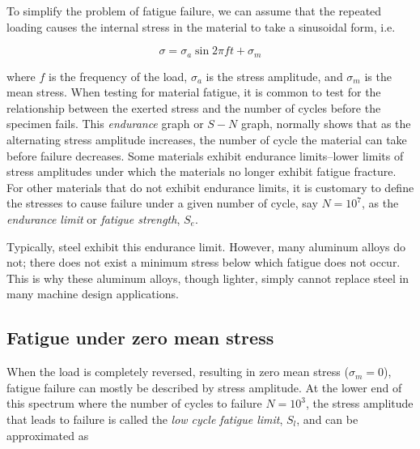 \documentclass[a4paper,openany,12pt]{book}
\begin{document}
To simplify the problem of fatigue failure, we can assume that the
repeated loading causes the internal stress in the material to take a
sinusoidal form, i.e.


$$\sigma  = \sigma _a\sin 2\pi ft + \sigma _m$$

where \(f\) is the frequency of the load, \(\sigma_a\) is the stress
amplitude, and \(\sigma_m\) is the mean stress. When testing for material
fatigue, it is common to test for the relationship between the exerted
stress and the number of cycles before the specimen fails. This
\emph{endurance} graph or \(S-N\) graph, normally shows that as the alternating
stress amplitude increases, the number of cycle the material can take
before failure decreases. Some materials exhibit endurance limits--lower
limits of stress amplitudes under which the materials no longer exhibit
fatigue fracture. For other materials that do not exhibit endurance
limits, it is customary to define the stresses to cause failure under a
given number of cycle, say \(N = 10^7\), as the \emph{endurance limit} or
\emph{fatigue strength}, \(S_e\).


Typically, steel exhibit this endurance limit. However, many aluminum
alloys do not; there does not exist a minimum stress below which fatigue
does not occur. This is why these aluminum alloys, though lighter,
simply cannot replace steel in many machine design applications.

\subsection{Fatigue under zero mean stress}
\label{sec:org3b5520c}
When the load is completely reversed, resulting in zero mean stress
(\(\sigma_m = 0\)), fatigue failure can mostly be described by stress
amplitude. At the lower end of this spectrum where the number of cycles
to failure \(N = 10^3\), the stress amplitude that leads to failure is
called the \emph{low cycle fatigue limit}, \(S_l\), and can be approximated as
\end{document}
